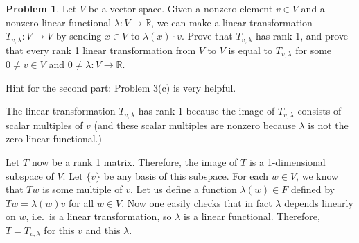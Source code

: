 \documentclass[11pt,oneside]{amsart}
\theoremstyle{definition}
\newtheorem{problem}{Problem}
\newcommand{\bR}{\mathbb{R}}
\begin{document}
    \begin{problem}
        Let $V$ be a vector space. Given a nonzero element $v\in V$ and a nonzero linear functional $\lambda\colon V\to \bR$, we can make a linear transformation $T_{v,\lambda}\colon V\to V$ by sending $x\in V$ to $\lambda(x)\cdot v$. Prove that $T_{v,\lambda}$ has rank 1, and prove that every rank 1 linear transformation from $V$ to $V$ is equal to $T_{v,\lambda}$ for some $0\neq v\in V$ and $0\neq \lambda\colon V\to \bR$.

        Hint for the second part: Problem 3(c) is very helpful.
    \end{problem}
    \begin{solution}
        The linear transformation $T_{v,\lambda}$ has rank 1 because the image of $T_{v,\lambda}$ consists of scalar multiples of $v$ (and these scalar multiples are nonzero because $\lambda$ is not the zero linear functional.)

        Let $T$ now be a rank 1 matrix. Therefore, the image of $T$ is a 1-dimensional subspace of $V$. Let $\{v\}$ be any basis of this subspace. For each $w\in V$, we know that $Tw$ is some multiple of $v$. Let us define a function $\lambda(w)\in F$ defined by $Tw=\lambda(w)v$ for all $w\in V$. Now one easily checks that in fact $\lambda$ depends linearly on $w$, i.e.\ is a linear transformation, so $\lambda$ is a linear functional. Therefore, $T=T_{v,\lambda}$ for this $v$ and this $\lambda$.
    \end{solution}
\end{document}
